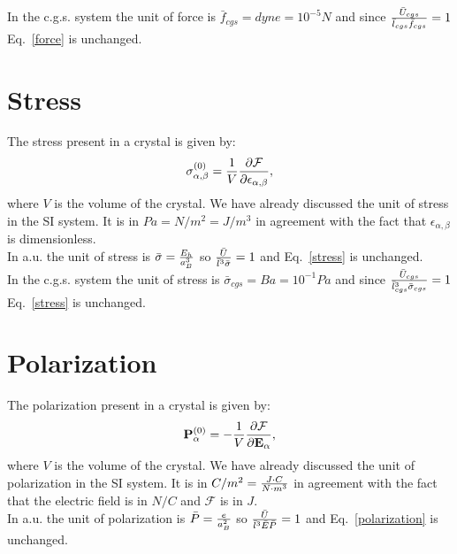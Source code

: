\documentclass[12pt,a4paper]{article}
\begin{document}
{\color{orange} In the c.g.s. system the unit of force 
is $\bar f_{cgs}=dyne=10^{-5} N$ and since ${\bar U_{cgs} \over 
\bar l_{cgs} \bar f_{cgs}}=1$ Eq.~\ref{force} is unchanged.
\\
}


\newpage
\section{\color{coral}Stress}
The stress present in a crystal is given by:
\begin{equation}
{\sigma}^{(0)}_{\alpha,\beta}={1\over V} 
{\partial \mathcal{F} \over \partial \epsilon_{\alpha,\beta}},
\label{stress}
\end{equation}
where $V$ is the volume of the crystal.
We have already discussed the unit of stress in the SI system. It is
in $Pa=N/m^2=J/m^3$ in agreement with the fact that 
$\epsilon_{\alpha,\beta}$ is dimensionless.
\\

{\color{web-blue} In a.u. the unit of stress is 
$\bar \sigma= {E_h \over a_B^3}$ so ${\bar U \over \bar l^3 \bar \sigma}=1$ and
Eq.~\ref{stress} is unchanged.
}
\\

{\color{orange} In the c.g.s. system the unit of stress
is $\bar \sigma_{cgs}=Ba=10^{-1} Pa$ and since ${\bar U_{cgs} \over 
\bar l_{cgs}^3 \bar \sigma_{cgs}}=1$ Eq.~\ref{stress} is unchanged.
\\
}

\newpage
\section{\color{coral}Polarization}
The polarization present in a crystal is given by:
\begin{equation}
{\bf P}^{(0)}_{\alpha}=-{1\over V} 
{\partial \mathcal{F} \over \partial {\bf E}_{\alpha}},
\label{polarization}
\end{equation}
where $V$ is the volume of the crystal.
We have already discussed the unit of polarization in the SI system. It is
in $C/m^2={J\cdot C \over N\cdot m^3}$ in agreement with the fact that the
electric field is in $N/C$ and $\mathcal{F}$ is in $J$.
\\

{\color{web-blue} In a.u. the unit of polarization is 
$\bar P= {e \over a_B^2}$ so ${\bar U \over \bar l^3 \bar E \bar P}=1$ and
Eq.~\ref{polarization} is unchanged.
}
\\
\end{document}
